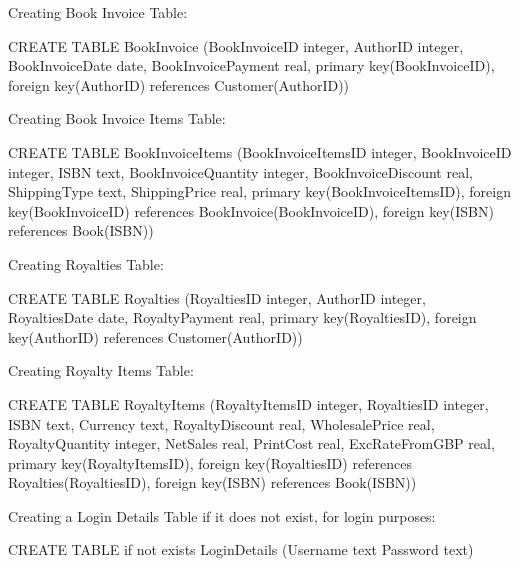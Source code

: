 Creating Book Invoice Table:
\begin{sql}
CREATE TABLE BookInvoice
                 (BookInvoiceID integer,
                 AuthorID integer,
                 BookInvoiceDate date,
                 BookInvoicePayment real,
                 primary key(BookInvoiceID),
                 foreign key(AuthorID) references Customer(AuthorID))
\end{sql}

Creating Book Invoice Items Table:
\begin{sql}
CREATE TABLE BookInvoiceItems
                 (BookInvoiceItemsID integer,
                 BookInvoiceID integer,
                 ISBN text,
                 BookInvoiceQuantity integer,
                 BookInvoiceDiscount real,
                 ShippingType text,
                 ShippingPrice real,
                 primary key(BookInvoiceItemsID),
                 foreign key(BookInvoiceID) references BookInvoice(BookInvoiceID),
                 foreign key(ISBN) references Book(ISBN))
\end{sql}

Creating Royalties Table:
\begin{sql}
CREATE TABLE Royalties
                 (RoyaltiesID integer,
                 AuthorID integer,
                 RoyaltiesDate date,
                 RoyaltyPayment real,
                 primary key(RoyaltiesID),
                 foreign key(AuthorID) references Customer(AuthorID))
\end{sql}

Creating Royalty Items Table:
\begin{sql}
CREATE TABLE RoyaltyItems
                 (RoyaltyItemsID integer,
                 RoyaltiesID integer,
                 ISBN text,
                 Currency text,
                 RoyaltyDiscount real,
                 WholesalePrice real,
                 RoyaltyQuantity integer,
                 NetSales real,
                 PrintCost real,
                 ExcRateFromGBP real,
                 primary key(RoyaltyItemsID),
                 foreign key(RoyaltiesID) references Royalties(RoyaltiesID),
                 foreign key(ISBN) references Book(ISBN))
\end{sql}

Creating a Login Details Table if it does not exist, for login purposes:
\begin{sql}
CREATE TABLE if not exists LoginDetails
                 (Username text
                 Password text)
\end{sql}

